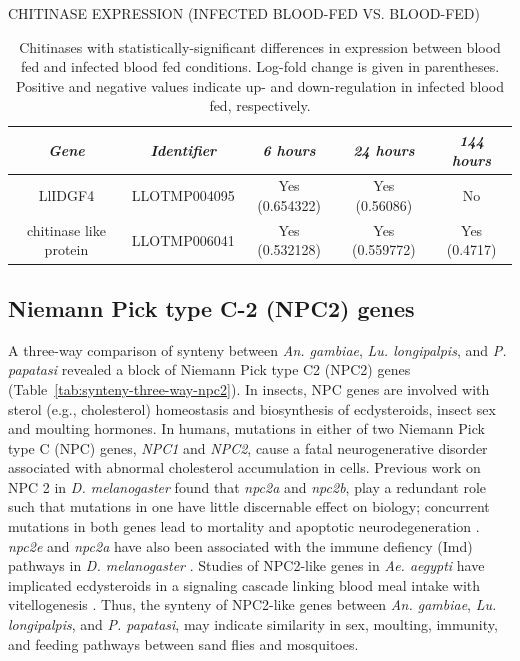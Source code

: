 \begin{table}[H]
  \centering
  \caption{CHITINASE EXPRESSION (INFECTED BLOOD-FED VS. BLOOD-FED)}
  \begin{tabular}{ c c c c c } \hline
    \emph{Gene} & \emph{Identifier} & \emph{6 hours} & \emph{24 hours} & \emph{144 hours} \\ \hline
    LlIDGF4 & LLOTMP004095 & Yes (0.654322) & Yes (0.56086) & No \\
    chitinase like protein & LLOTMP006041 & Yes (0.532128) & Yes (0.559772) & Yes (0.4717)
  \end{tabular}
  \caption*{Chitinases with statistically-significant differences in expression between blood fed and infected blood fed conditions. Log-fold change is given in parentheses. Positive and negative values indicate up- and down-regulation in infected blood fed, respectively.}
  \label{tab:sandflies:stat-sig-chitinases-bi}
\end{table}


\subsection{Niemann Pick type C-2 (NPC2) genes}
A three-way comparison of synteny between \emph{An. gambiae}, \emph{Lu. longipalpis}, and \emph{P. papatasi} revealed a block of Niemann Pick type C2 (NPC2) genes (Table~\ref{tab:synteny-three-way-npc2}). In insects, NPC genes are involved with sterol (e.g., cholesterol) homeostasis and biosynthesis of ecdysteroids, insect sex and moulting hormones. In humans, mutations in either of two Niemann Pick type C (NPC) genes, \emph{NPC1} and \emph{NPC2}, cause a fatal neurogenerative disorder associated with abnormal cholesterol accumulation in cells.  Previous work on NPC 2 in \emph{D. melanogaster} found that \emph{npc2a} and \emph{npc2b}, play a redundant role such that mutations in one have little discernable effect on biology; concurrent mutations in both genes lead to mortality and apoptotic neurodegeneration \cite{Huang2007}.  \emph{npc2e} and \emph{npc2a} have also been associated with the immune defiency (Imd) pathways in \emph{D. melanogaster} \cite{Shi2012}. Studies of NPC2-like genes in \emph{Ae. aegypti} have implicated ecdysteroids in a signaling cascade linking blood meal intake with vitellogenesis \cite{Sirot2011}.  Thus, the synteny of NPC2-like genes between \emph{An. gambiae}, \emph{Lu. longipalpis}, and \emph{P. papatasi}, may indicate similarity in sex, moulting, immunity, and feeding pathways between sand flies and mosquitoes.

